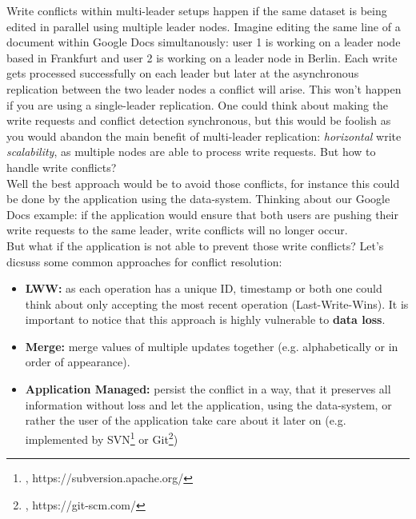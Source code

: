 {
Write conflicts within multi-leader setups happen if the same dataset is being edited in parallel using multiple leader nodes. Imagine editing the same line of a document within Google Docs simultanously: user 1 is working on a leader node based in Frankfurt and user 2 is working on a leader node in Berlin. Each write gets processed successfully on each leader but later at the asynchronous replication between the two leader nodes a conflict will arise. This won't happen if you are using a single-leader replication. One could think about making the write requests and conflict detection synchronous, but this would be foolish as you would abandon the main benefit of multi-leader replication: \textit{horizontal} write \textit{scalability}, as multiple nodes are able to process write requests. But how to handle write conflicts?\\
Well the best approach would be to avoid those conflicts, for instance this could be done by the application using the data-system. Thinking about our Google Docs example: if the application would ensure that both users are pushing their write requests to the same leader, write conflicts will no longer occur.\\
But what if the application is not able to prevent those write conflicts? Let's dicsuss some common approaches for conflict resolution:\\

\begin{itemize}
\item \textbf{LWW:} as each operation has a unique ID, timestamp or both one could think about only accepting the most recent operation (Last-Write-Wins). It is important to notice that this approach is highly vulnerable to \textbf{data loss}.
\item \textbf{Merge:} merge values of multiple updates together (e.g. alphabetically or in order of appearance).
\item \textbf{Application Managed:} persist the conflict in a way, that it preserves all information without loss and let the application, using the data-system, or rather the user of the application take care about it later on (e.g. implemented by SVN\footnote{\cite{SVNWS}, https://subversion.apache.org/} or Git\footnote{\cite{GITWS}, https://git-scm.com/})
\end{itemize}


}
